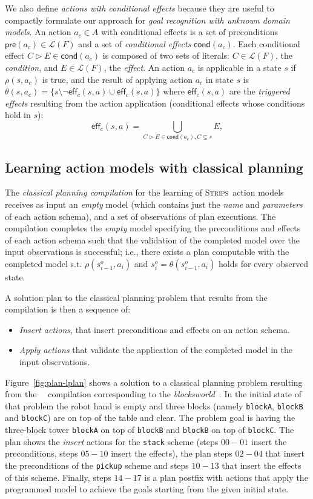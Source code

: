\documentclass{article}
\newcommand{\pre}{\mathsf{pre}}     %
\newcommand{\eff}{\mathsf{eff}}     %
\newcommand{\cond}{\mathsf{cond}}   %
\newcommand{\strips}{\textsc{Strips}}
\begin{document}
We also define {\em actions with conditional effects} because they are useful to compactly formulate our approach for {\em goal recognition with unknown domain models}. An action $a_c\in A$ with conditional effects is a set of preconditions $\pre(a_c)\in\mathcal{L}(F)$ and a set of {\em conditional effects} $\cond(a_c)$. Each conditional effect $C\rhd E\in\cond(a_c)$ is composed of two sets of literals: $C\in\mathcal{L}(F)$, the {\em condition}, and $E\in\mathcal{L}(F)$, the {\em effect}. An action $a_c$ is applicable in a state $s$ if $\rho(s,a_c)$ is true, and the result of applying action $a_c$ in state $s$ is $\theta(s,a_c)=\{s\setminus\neg\eff_c(s,a)\cup\eff_c(s,a)\}$ where $\eff_c(s,a)$ are the {\em triggered effects} resulting from the action application (conditional effects whose conditions hold in $s$):
\[
\eff_c(s,a)=\bigcup_{C\rhd E\in\cond(a_c),C\subseteq s} E,
\]

\subsection{Learning action models with classical planning}
The {\em classical planning compilation} for the learning of \strips\ action models~\cite{aineto2018learning} receives as input an {\em empty} model (which contains just the {\em name} and {\em parameters} of each action schema), and a set of observations of plan executions. The compilation completes the {\em empty} model specifying the preconditions and effects of each action schema such that the validation of the completed model over the input observations is successful; i.e., there exists a plan computable with the completed model s.t. $\rho(s_{i-1}^o,a_i)$ and $s_i^o=\theta(s_{i-1}^o,a_i)$ holds for every observed state.

A solution plan to the classical planning problem that results from the compilation is then a sequence of:
\begin{itemize}
\item \emph{Insert actions}, that insert preconditions and effects on an action schema.
\item \emph{Apply actions} that validate the application of the completed model in the input observations.
\end{itemize}
Figure~\ref{fig:plan-lplan} shows a solution to a classical planning problem resulting from the~\citeauthor{aineto2018learning}~\citeyear{aineto2018learning} compilation corresponding to the {\em blocksworld}~\cite{slaney2001blocks}. In the initial state of that problem the robot hand is empty and three blocks (namely {\small\tt blockA}, {\small\tt blockB} and {\small\tt blockC}) are on top of the table and clear. The problem goal is having the three-block tower {\tt blockA} on top of {\tt blockB} and {\tt blockB} on top of {\tt blockC}. The plan shows the {\em insert} actions for the {\tt\small stack} scheme (steps $00-01$ insert the preconditions, steps $05-10$ insert the effects), the plan steps $02-04$ that  insert the preconditions of the {\tt\small pickup} scheme and steps $10-13$ that insert the effects of this scheme. Finally, steps $14-17$ is a plan postfix with actions that apply the programmed model to achieve the goals starting from the given initial state.
\end{document}
